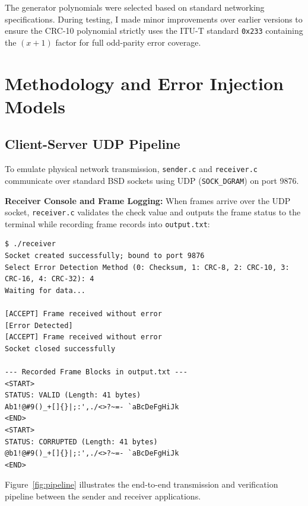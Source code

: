 \documentclass[12pt,a4paper]{article}
\begin{document}
The generator polynomials were selected based on standard networking specifications. During testing, I made minor improvements over earlier versions to ensure the CRC-10 polynomial strictly uses the ITU-T standard \texttt{0x233} containing the $(x+1)$ factor for full odd-parity error coverage.

\section{Methodology and Error Injection Models}

\subsection{Client-Server UDP Pipeline}
To emulate physical network transmission, \texttt{sender.c} and \texttt{receiver.c} communicate over standard BSD sockets using UDP (\texttt{SOCK\_DGRAM}) on port 9876. 

\noindent\begin{minipage}{\linewidth}
\noindent\textbf{Receiver Console and Frame Logging:} When frames arrive over the UDP socket, \texttt{receiver.c} validates the check value and outputs the frame status to the terminal while recording frame records into \texttt{output.txt}:

\begin{lstlisting}[language={},caption={Receiver Console Execution and Generated Frame Log (\texttt{output.txt})}]
$ ./receiver
Socket created successfully; bound to port 9876
Select Error Detection Method (0: Checksum, 1: CRC-8, 2: CRC-10, 3: CRC-16, 4: CRC-32): 4
Waiting for data...

[ACCEPT] Frame received without error
[Error Detected]
[ACCEPT] Frame received without error
Socket closed successfully

--- Recorded Frame Blocks in output.txt ---
<START>
STATUS: VALID (Length: 41 bytes)
Ab1!@#9()_+[]{}|;:',./<>?~=- `aBcDeFgHiJk
<END>
<START>
STATUS: CORRUPTED (Length: 41 bytes)
@b1!@#9()_+[]{}|;:',./<>?~=- `aBcDeFgHiJk
<END>
\end{lstlisting}
\end{minipage}

Figure~\ref{fig:pipeline} illustrates the end-to-end transmission and verification pipeline between the sender and receiver applications.
\end{document}
